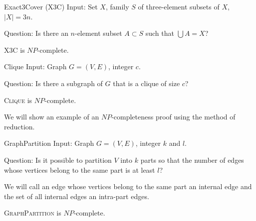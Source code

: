 \begin{problem}{Exact3Cover (X3C)}
	Input: Set $X$, family $S$ of three-element subsets of $X$, $\vert{X}\vert = 3n$.

	Question: Is there an $n$-element subset $A \subset S$ such that $\bigcup A = X$?
\end{problem}

\begin{thm}
\textsc{X3C} is $NP$-complete.
\end{thm}


\begin{problem}{Clique}
    Input: Graph $G = (V, E)$, integer $c$.

    Question: Is there a subgraph of $G$ that is a clique of size $c$?
\end{problem}

\begin{thm}
\textsc{Clique} is $NP$-complete.
\end{thm}


We will show an example of an $NP$-completeness proof using the method of reduction.

\begin{problem}{GraphPartition}
Input: Graph $G = (V, E)$, integer $k$ and $l$.

Question: Is it possible to partition $V$ into $k$ parts so that the number of edges
whose vertices belong to the same part is at least $l$?
\end{problem}

We will call an edge whose vertices belong to the same part an internal edge
and the set of all internal edges an intra-part edges.

\begin{thm} \label{gp-np}
\textsc{GraphPartition} is $NP$-complete.
\end{thm}

